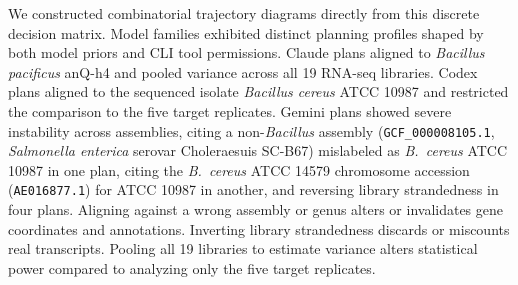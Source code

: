 \documentclass[11pt,letterpaper]{article}
\begin{document}
We constructed combinatorial trajectory diagrams directly from this discrete decision matrix. Model families exhibited distinct planning profiles shaped by both model priors and CLI tool permissions. Claude plans aligned to \textit{Bacillus pacificus} anQ-h4 and pooled variance across all 19 RNA-seq libraries. Codex plans aligned to the sequenced isolate \textit{Bacillus cereus} ATCC 10987 and restricted the comparison to the five target replicates. Gemini plans showed severe instability across assemblies, citing a non-\textit{Bacillus} assembly (\texttt{GCF\_000008105.1}, \textit{Salmonella enterica} serovar Choleraesuis SC-B67) mislabeled as \textit{B.\ cereus} ATCC 10987 in one plan, citing the \textit{B.\ cereus} ATCC 14579 chromosome accession (\texttt{AE016877.1}) for ATCC 10987 in another, and reversing library strandedness in four plans. Aligning against a wrong assembly or genus alters or invalidates gene coordinates and annotations. Inverting library strandedness discards or miscounts real transcripts. Pooling all 19 libraries to estimate variance alters statistical power compared to analyzing only the five target replicates.
\end{document}
